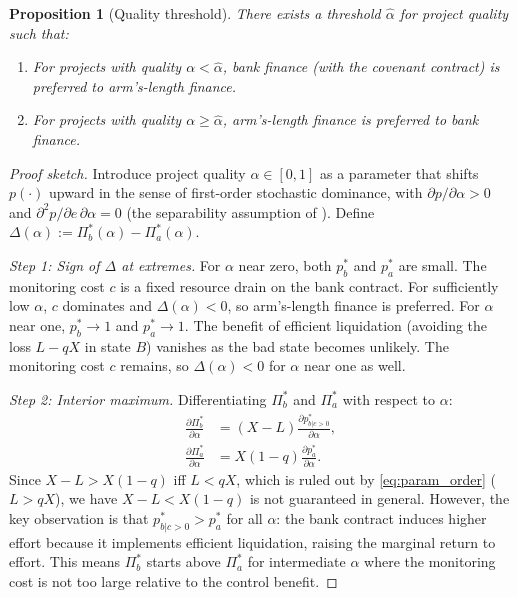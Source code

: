 \documentclass[12pt,a4paper]{article}
\theoremstyle{plain}
\newtheorem{proposition}[theorem]{Proposition}
\theoremstyle{definition}
\theoremstyle{remark}
\begin{document}
\begin{proposition}[Quality threshold]
\label{p:quality_threshold}
There exists a threshold $\hat{\alpha}$ for project quality such that:
\begin{enumerate}[nosep,label=(\alph*)]
  \item For projects with quality $\alpha < \hat{\alpha}$, bank finance (with the
    covenant contract) is preferred to arm's-length finance.
  \item For projects with quality $\alpha \geq \hat{\alpha}$, arm's-length finance is
    preferred to bank finance.
\end{enumerate}
\end{proposition}

\begin{proof}[Proof sketch]
Introduce project quality $\alpha \in [0,1]$ as a parameter that shifts $p(\cdot)$
upward in the sense of first-order stochastic dominance, with $\partial p / \partial
\alpha > 0$ and $\partial^2 p / \partial e \, \partial \alpha = 0$ (the separability
assumption of \citealt{Rajan1992}). Define $\Delta(\alpha) := \Pi^*_b(\alpha) -
\Pi^*_a(\alpha)$.

\emph{Step 1: Sign of $\Delta$ at extremes.} For $\alpha$ near zero, both $p^*_b$
and $p^*_a$ are small. The monitoring cost $c$ is a fixed resource drain on the bank
contract. For sufficiently low $\alpha$, $c$ dominates and $\Delta(\alpha) < 0$, so
arm's-length finance is preferred. For $\alpha$ near one, $p^*_b \to 1$ and
$p^*_a \to 1$. The benefit of efficient liquidation (avoiding the loss $L - qX$ in
state $B$) vanishes as the bad state becomes unlikely. The monitoring cost $c$ remains,
so $\Delta(\alpha) < 0$ for $\alpha$ near one as well.

\emph{Step 2: Interior maximum.} Differentiating $\Pi^*_b$ and $\Pi^*_a$ with
respect to $\alpha$:
\begin{align}
  \frac{\partial \Pi^*_b}{\partial \alpha} &= (X - L) \frac{\partial p^*_{b|c>0}}{\partial \alpha}, \\
  \frac{\partial \Pi^*_a}{\partial \alpha} &= X(1-q) \frac{\partial p^*_a}{\partial \alpha}.
\end{align}
Since $X - L > X(1-q)$ iff $L < qX$, which is ruled out by \cref{eq:param_order}
($L > qX$), we have $X - L < X(1-q)$ is not guaranteed in general. However, the
key observation is that $p^*_{b|c>0} > p^*_a$ for all $\alpha$: the bank contract
induces higher effort because it implements efficient liquidation, raising the marginal
return to effort. This means $\Pi^*_b$ starts above $\Pi^*_a$ for intermediate
$\alpha$ where the monitoring cost is not too large relative to the control benefit.


\end{proof}
\end{document}
